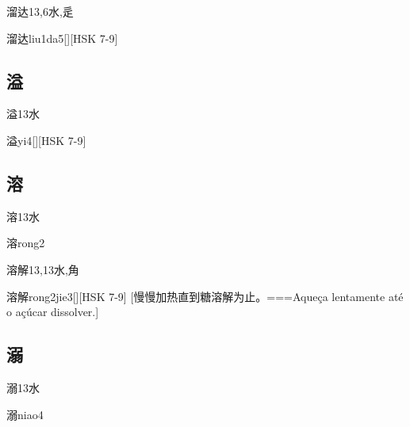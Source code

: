 \begin{Entry}{溜达}{13,6}{⽔,⾡}
  \begin{Phonetics}{溜达}{liu1da5}[][HSK 7-9]
  \end{Phonetics}
\end{Entry}

\subsection*{溢}

\begin{Entry}{溢}{13}{⽔}
  \begin{Phonetics}{溢}{yi4}[][HSK 7-9]
  \end{Phonetics}
\end{Entry}

\subsection*{溶}

\begin{Entry}{溶}{13}{⽔}
  \begin{Phonetics}{溶}{rong2}
  \end{Phonetics}
\end{Entry}

\begin{Entry}{溶解}{13,13}{⽔,⾓}
  \begin{Phonetics}{溶解}{rong2jie3}[][HSK 7-9]
    [慢慢加热直到糖溶解为止。===Aqueça lentamente até o açúcar dissolver.]
  \end{Phonetics}
\end{Entry}

\subsection*{溺}

\begin{Entry}{溺}{13}{⽔}
  \begin{Phonetics}{溺}{niao4}
  \end{Phonetics}
\end{Entry}

